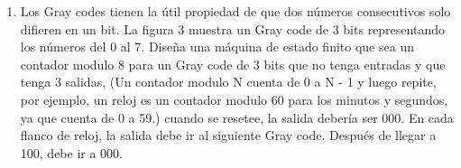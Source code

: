\documentclass[letterpaper,12pt]{article}
\begin{document}
\begin{enumerate}
    \item Los Gray codes tienen la útil propiedad de que dos números consecutivos solo difieren en un bit. La figura 3 muestra un Gray code de 3 bits representando los números del 0 al 7. Diseña una máquina de estado finito que sea un contador modulo 8 para un Gray code de 3 bits que no tenga entradas y que tenga 3 salidas, (Un contador modulo N cuenta de 0 a N - 1 y luego repite, por ejemplo, un reloj es un contador modulo 60 para los minutos y segundos, ya que cuenta de 0 a 59.) cuando se resetee, la salida debería ser 000. En cada flanco de reloj, la salida debe ir al siguiente Gray code. Después de llegar a 100, debe ir a 000.
    
\end{enumerate}
\end{document}
